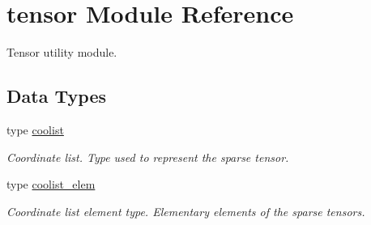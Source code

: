 \hypertarget{classtensor}{\section{tensor Module Reference}
\label{classtensor}
}


Tensor utility module.  


\subsection*{Data Types}
\begin{DoxyCompactItemize}
\item 
type \hyperlink{structtensor_1_1coolist}{coolist}
\begin{DoxyCompactList}\small\item\em Coordinate list. Type used to represent the sparse tensor. \end{DoxyCompactList}\item 
type \hyperlink{structtensor_1_1coolist__elem}{coolist\-\_\-elem}
\begin{DoxyCompactList}\small\item\em Coordinate list element type. Elementary elements of the sparse tensors. \end{DoxyCompactList}\end{DoxyCompactItemize}
